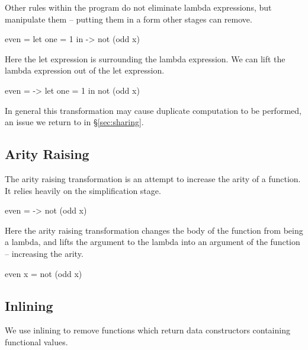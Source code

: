 \documentclass[preprint]{sigplanconf}
\begin{document}
Other rules within the program do not eliminate lambda expressions, but manipulate them -- putting them in a form other stages can remove.

\begin{example}
\begin{code}
even =  let one = 1
        in \x -> not (odd x)
\end{code}

Here the let expression is surrounding the lambda expression. We can lift the lambda expression out of the let expression.

\begin{code}
even = \x ->  let one = 1
              in not (odd x)
\end{code}

In general this transformation may cause duplicate computation to be performed, an issue we return to in \S\ref{sec:sharing}.
\end{example}


\subsection{Arity Raising}

The arity raising transformation is an attempt to increase the arity of a function. It relies heavily on the simplification stage.

\begin{example}
\begin{code}
even = \x -> not (odd x)
\end{code}

Here the arity raising transformation changes the body of the function from being a lambda, and lifts the argument to the lambda into an argument of the function -- increasing the arity.

\begin{code}
even x = not (odd x)
\end{code}
\end{example}


\subsection{Inlining}

We use inlining to remove functions which return data constructors containing functional values.
\end{document}
